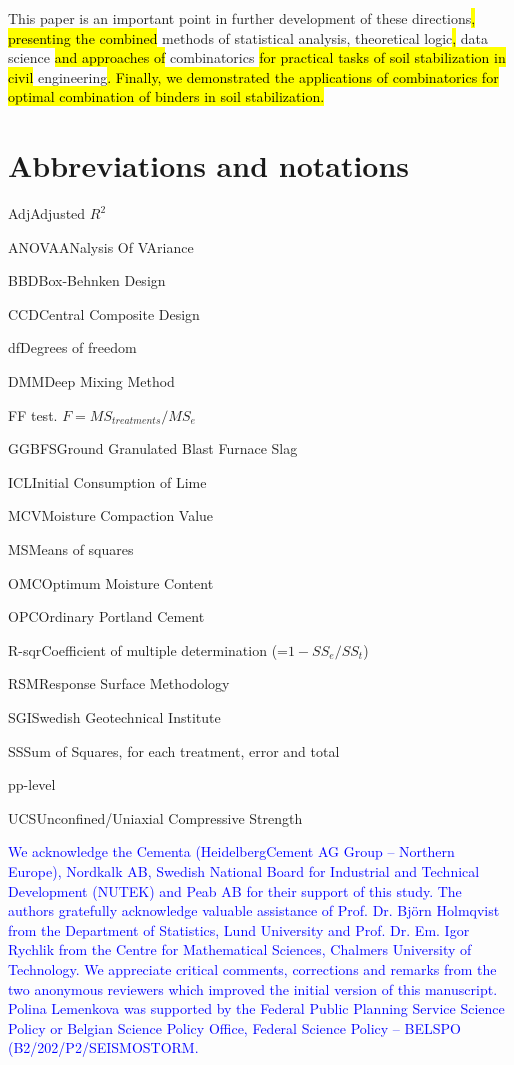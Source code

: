 \documentclass[eprint,
]{actapoly}
\begin{document}
This paper is an important point in further development of these directions\hl{, presenting the combined }methods of statistical\hl{ }analysis, theoretical logic\hl{, }data science\hl{ and approaches of }combinatorics\hl{ for practical tasks of soil stabilization in civil }engineering\hl{. Finally, we demonstrated the applications of combinatorics for optimal combination of binders in soil stabilization.}

\section{Abbreviations and notations}\label{symb}
\begin{nomenclature}
\item{Adj}{Adjusted $R^2$}
\item{ANOVA}{ANalysis Of VAriance}
\item{BBD}{Box-Behnken Design}
\item{CCD}{Central Composite Design}
\item{df}{Degrees of freedom}
\item{DMM}{Deep Mixing Method}
\item{F}{F test. $F=MS_{treatments}/MS_{e}$}
\item{GGBFS}{Ground Granulated Blast Furnace Slag}
\item{ICL}{Initial Consumption of Lime}
\item{MCV}{Moisture Compaction Value}
\item{MS}{Means of squares}
\item{OMC}{Optimum Moisture Content}
\item{OPC}{Ordinary Portland Cement}
\item{R-sqr}{Coefficient of multiple determination (=$1-SS_{e}/SS_{t}$)}
\item{RSM}{Response Surface Methodology}
\item{SGI}{Swedish Geotechnical Institute}
\item{SS}{Sum of Squares, for each treatment, error and total}
\item{p}{p-level}
\item{UCS}{Unconfined/Uniaxial Compressive Strength}
\end{nomenclature}

\begin{acknowledgements}
\textcolor{blue}{We acknowledge the Cementa (HeidelbergCement AG Group -- Northern Europe), Nordkalk AB, Swedish National Board for Industrial and Technical Development (NUTEK) and Peab AB for their support of this study. The authors gratefully acknowledge  valuable assistance of Prof. Dr. Björn Holmqvist from the Department of Statistics, Lund University and Prof. Dr. Em. Igor Rychlik from the Centre for Mathematical Sciences, Chalmers University of Technology. We appreciate critical comments, corrections and remarks from the two anonymous reviewers which improved the initial version of this manuscript. Polina Lemenkova was supported by the Federal Public Planning Service Science Policy or Belgian Science Policy Office, Federal Science Policy -- BELSPO (B2/202/P2/SEISMOSTORM.}
\end{acknowledgements}




\end{document}
